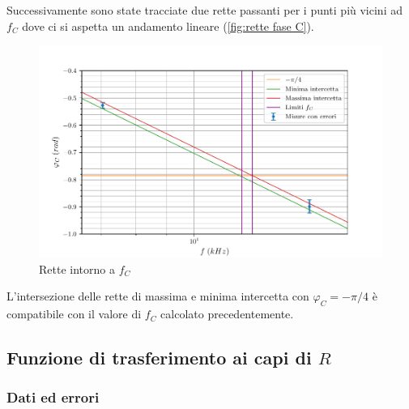 \documentclass[11pt, a4paper]{article}
\numberwithin{equation}{section} %
\begin{document}
\newpage

Successivamente sono state tracciate due rette passanti per i punti più vicini ad $f_{C}$ dove ci si aspetta un andamento lineare (\autoref{fig:rette fase C}).

\begin{figure}[ht!]
    \includegraphics{onda_sin_phi(f)_C_intercette.pdf}
    \caption{Rette intorno a $f_{C}$}
    \label{fig:rette fase C}
\end{figure}

\newpage

L'intersezione delle rette di massima e minima intercetta con $\varphi_{C} = -\pi/4$ è compatibile con il valore di $f_{C}$ calcolato precedentemente.



\subsection{Funzione di trasferimento ai capi di $R$}

\subsubsection{Dati ed errori}
\end{document}
